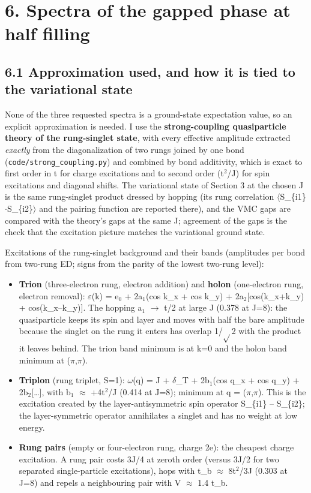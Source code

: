 \documentclass[10pt]{article}
\begin{document}
\section*{6. Spectra of the gapped phase at half filling}

\subsection*{6.1 Approximation used, and how it is tied to the variational state}

None of the three requested spectra is a ground-state expectation value, so an explicit approximation is needed. I use the \textbf{strong-coupling quasiparticle theory of the rung-singlet state}, with every effective amplitude extracted \emph{exactly} from the diagonalization of two rungs joined by one bond (\texttt{code/strong\_coupling.py}) and combined by bond additivity, which is exact to first order in t for charge excitations and to second order (t$^2$/J) for spin excitations and diagonal shifts. The variational state of Section 3 at the chosen J is the same rung-singlet product dressed by hopping (its rung correlation $\langle$S\_\{i1\}$\cdot$S\_\{i2\}$\rangle$ and the pairing function are reported there), and the VMC gaps are compared with the theory's gaps at the same J; agreement of the gaps is the check that the excitation picture matches the variational ground state.

Excitations of the rung-singlet background and their bands (amplitudes per bond from two-rung ED; signs from the parity of the lowest two-rung level):

\begin{itemize}
\item \textbf{Trion} (three-electron rung, electron addition) and \textbf{holon} (one-electron rung, electron removal):
$\varepsilon$(k) = e$_0$ + 2a$_1$(cos k\_x + cos k\_y) + 2a$_2$[cos(k\_x+k\_y) + cos(k\_x--k\_y)]. The hopping a$_1$ $\to$ t/2 at large J
(0.378 at J=8): the quasiparticle keeps its spin and layer and moves with half the bare amplitude because the
singlet on the rung it enters has overlap 1/$\sqrt{}$2 with the product it leaves behind. The trion band minimum is at
k=0 and the holon band minimum at ($\pi$,$\pi$).
\item \textbf{Triplon} (rung triplet, S=1): $\omega$(q) = J + $\delta$\_T + 2b$_1$(cos q\_x + cos q\_y) + 2b$_2$[\ldots{}], with b$_1$ $\approx$ +4t$^2$/J (0.414 at
J=8); minimum at q = ($\pi$,$\pi$). This is the excitation created by the layer-antisymmetric spin operator
S\_\{i1\} -- S\_\{i2\}; the layer-symmetric operator annihilates a singlet and has no weight at low energy.
\item \textbf{Rung pairs} (empty or four-electron rung, charge 2e): the cheapest charge excitation. A rung pair costs 3J/4
at zeroth order (versus 3J/2 for two separated single-particle excitations), hops with t\_b $\approx$ 8t$^2$/3J (0.303 at
J=8) and repels a neighbouring pair with V $\approx$ 1.4 t\_b.
\end{itemize}
\end{document}
